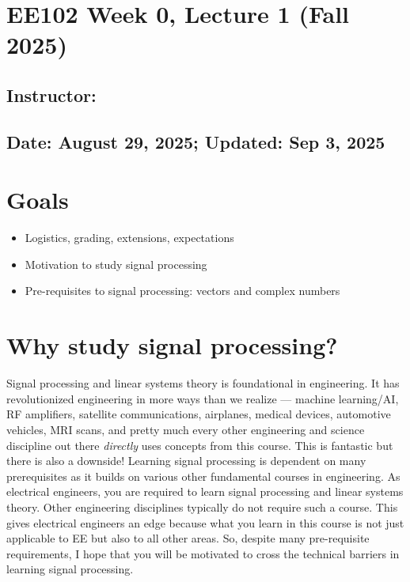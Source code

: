 \documentclass{ee102_notes}
\renewcommand{\releasedate}{August 29, 2025; Updated: Sep 3, 2025}
\begin{document}
\section*{EE102 Week 0, Lecture 1 (Fall 2025)}
\subsection*{Instructor: \instructor}
\subsection*{Date: \releasedate}
\section{Goals}
\begin{itemize}
  \item Logistics, grading, extensions, expectations
  \item Motivation to study signal processing
  \item Pre-requisites to signal processing: vectors and complex numbers
\end{itemize}

\section{Why study signal processing?}
Signal processing and linear systems theory is foundational in engineering. It has revolutionized engineering in more ways than we realize --- machine learning/AI, RF amplifiers, satellite communications, airplanes, medical devices, automotive vehicles, MRI scans, and pretty much every other engineering and science discipline out there \emph{directly} uses concepts from this course. This is fantastic but there is also a downside! Learning signal processing is dependent on many prerequisites as it builds on various other fundamental courses in engineering. As electrical engineers, you are required to learn signal processing and linear systems theory. Other engineering disciplines typically do not require such a course. This gives electrical engineers an edge because what you learn in this course is not just applicable to EE but also to all other areas. So, despite many pre-requisite requirements, I hope that you will be motivated to cross the technical barriers  in learning signal processing.
\end{document}
